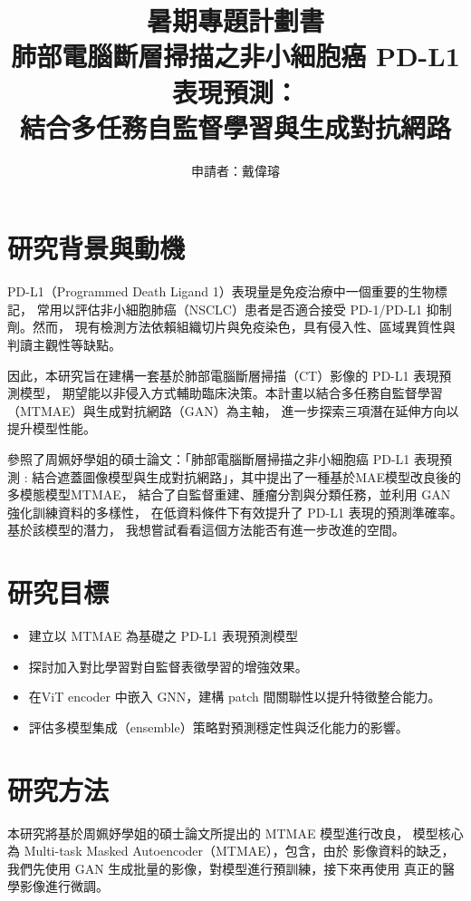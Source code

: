 \documentclass[12pt,a4paper]{article}
\title{暑期專題計劃書\\\large 肺部電腦斷層掃描之非小細胞癌 PD-L1 表現預測：\\結合多任務自監督學習與生成對抗網路}
\author{申請者：戴偉璿}
\begin{document}

\maketitle

\newpage

\section{研究背景與動機}
PD-L1（Programmed Death Ligand 1）表現量是免疫治療中一個重要的生物標記，
常用以評估非小細胞肺癌（NSCLC）患者是否適合接受 PD-1/PD-L1 抑制劑。然而，
現有檢測方法依賴組織切片與免疫染色，具有侵入性、區域異質性與判讀主觀性等缺點。

因此，本研究旨在建構一套基於肺部電腦斷層掃描（CT）影像的 PD-L1 表現預測模型，
期望能以非侵入方式輔助臨床決策。本計畫以結合多任務自監督學習（MTMAE）與生成對抗網路（GAN）為主軸，
進一步探索三項潛在延伸方向以提升模型性能。

參照了周姵妤學姐的碩士論文：「肺部電腦斷層掃描之非小細胞癌 PD-L1 表現預測 :
結合遮蓋圖像模型與生成對抗網路」，其中提出了一種基於MAE模型改良後的多模態模型MTMAE，
結合了自監督重建、腫瘤分割與分類任務，並利用 GAN 強化訓練資料的多樣性，
在低資料條件下有效提升了 PD-L1 表現的預測準確率。基於該模型的潛力，
我想嘗試看看這個方法能否有進一步改進的空間。

\section{研究目標}
\begin{itemize}
  \item 建立以 MTMAE 為基礎之 PD-L1 表現預測模型
  \item 探討加入對比學習對自監督表徵學習的增強效果。
  \item 在ViT encoder 中嵌入 GNN，建構 patch 間關聯性以提升特徵整合能力。
  \item 評估多模型集成（ensemble）策略對預測穩定性與泛化能力的影響。
\end{itemize}

\section{研究方法}
本研究將基於周姵妤學姐的碩士論文所提出的 MTMAE 模型進行改良，
模型核心為 Multi-task Masked Autoencoder（MTMAE），包含，由於
影像資料的缺乏，我們先使用 GAΝ 生成批量的影像，對模型進行預訓練，接下來再使用
真正的醫學影像進行微調。
\end{document}
